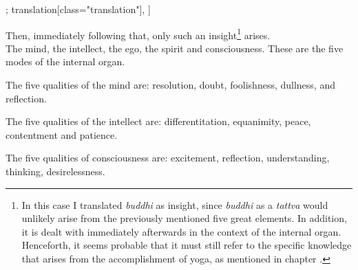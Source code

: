 \begin{alignment}[
  texts=edition[class="edition"];
  translation[class="translation"],
  ]
  \begin{translation}
    \begin{tlate}
      Then, immediately following that, only such an insight\footnote{In this case I translated \textit{buddhi} as insight, since \textit{buddhi} as a \textit{tattva} would unlikely arise from the previously mentioned five great elements. In addition, it is dealt with immediately afterwards in the context of the internal organ. Henceforth, it seems probable that it must still refer to the specific knowledge that arises from the accomplishment of yoga, as mentioned in chapter .} arises.\\
      The mind, the intellect, the ego, the spirit and consciousness. These are the five modes of the internal organ.
      
The five qualities of the mind are: resolution, doubt, foolishness, dullness, and reflection. 

The five qualities of the intellect are: differentitation, equanimity, peace, contentment and patience.



The five qualities of consciousness are: excitement, reflection, understanding, thinking, desirelessness.
\vfill
    \end{tlate}
  \end{translation}
\end{alignment}
\pagebreak %
